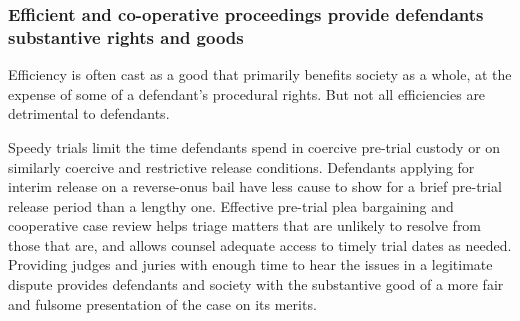 \subsubsection{Efficient and co-operative proceedings provide defendants substantive rights and goods}

Efficiency is often cast as a good that primarily benefits society as a whole, at the expense of some of a defendant's procedural rights. But not all efficiencies are detrimental to defendants. 

Speedy trials limit the time defendants spend in coercive pre-trial custody or on similarly coercive and restrictive release conditions. Defendants applying for interim release on a reverse-onus bail have less cause to show for a brief pre-trial release period than a lengthy one. Effective pre-trial plea bargaining and cooperative case review helps triage matters that are unlikely to resolve from those that are, and allows counsel adequate access to timely trial dates as needed. Providing judges and juries with enough time to hear the issues in a legitimate dispute provides defendants and society with the substantive good of a more fair and fulsome presentation of the case on its merits.